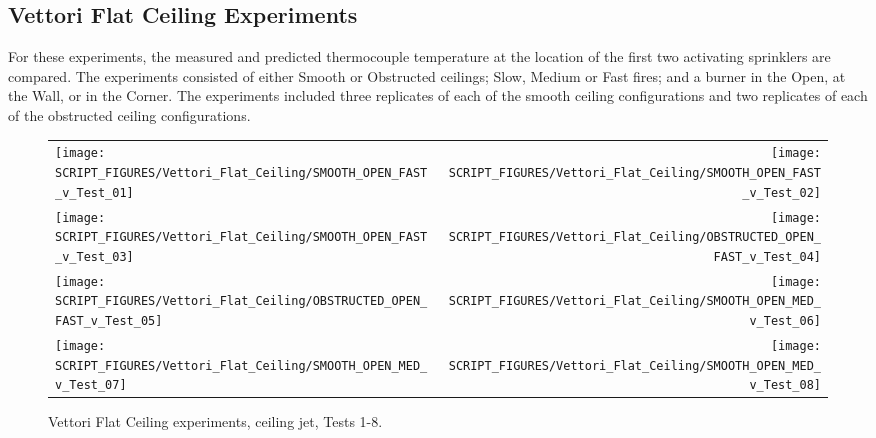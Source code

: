 \clearpage

\subsection{Vettori Flat Ceiling Experiments}
\label{Vettori_Flat_Results}

For these experiments, the measured and predicted thermocouple temperature at the location of the first two activating sprinklers are compared. The experiments consisted of either Smooth or Obstructed ceilings; Slow, Medium or Fast fires; and a burner in the Open, at the Wall, or in the Corner.
The experiments included three replicates of each of the smooth ceiling configurations and two replicates of each of the obstructed ceiling configurations.

\newpage

\begin{figure}[p]
\begin{tabular*}{\textwidth}{l@{\extracolsep{\fill}}r}
\texttt{[image: SCRIPT\_FIGURES/Vettori\_Flat\_Ceiling/SMOOTH\_OPEN\_FAST\_v\_Test\_01]} &
\texttt{[image: SCRIPT\_FIGURES/Vettori\_Flat\_Ceiling/SMOOTH\_OPEN\_FAST\_v\_Test\_02]} \\
\texttt{[image: SCRIPT\_FIGURES/Vettori\_Flat\_Ceiling/SMOOTH\_OPEN\_FAST\_v\_Test\_03]} &
\texttt{[image: SCRIPT\_FIGURES/Vettori\_Flat\_Ceiling/OBSTRUCTED\_OPEN\_FAST\_v\_Test\_04]} \\
\texttt{[image: SCRIPT\_FIGURES/Vettori\_Flat\_Ceiling/OBSTRUCTED\_OPEN\_FAST\_v\_Test\_05]} &
\texttt{[image: SCRIPT\_FIGURES/Vettori\_Flat\_Ceiling/SMOOTH\_OPEN\_MED\_v\_Test\_06]} \\
\texttt{[image: SCRIPT\_FIGURES/Vettori\_Flat\_Ceiling/SMOOTH\_OPEN\_MED\_v\_Test\_07]} &
\texttt{[image: SCRIPT\_FIGURES/Vettori\_Flat\_Ceiling/SMOOTH\_OPEN\_MED\_v\_Test\_08]} \\
\end{tabular*}
\caption{Vettori Flat Ceiling experiments, ceiling jet, Tests 1-8.}
\label{Vettori_1}
\end{figure}

